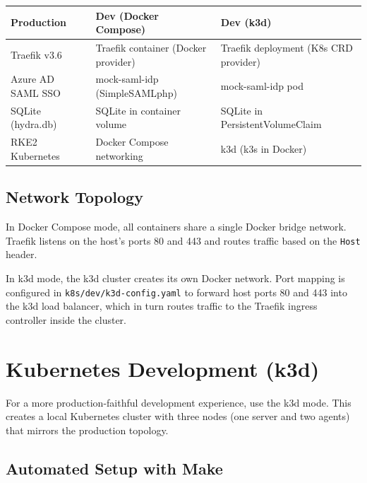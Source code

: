\documentclass[11pt,a4paper]{article}
\newcommand{\cmdref}[1]{\texttt{#1}}
\begin{document}
\begin{center}
\small
\begin{tabularx}{\textwidth}{l X X}
    \toprule
    \textbf{Production} & \textbf{Dev (Docker Compose)} & \textbf{Dev (k3d)} \\
    \midrule
    Traefik v3.6 &
        Traefik container (Docker provider) &
        Traefik deployment (K8s CRD provider) \\
    \addlinespace
    Azure AD SAML SSO &
        mock-saml-idp (SimpleSAMLphp) &
        mock-saml-idp pod \\
    \addlinespace
    SQLite (hydra.db) &
        SQLite in container volume &
        SQLite in PersistentVolumeClaim \\
    \addlinespace
    RKE2 Kubernetes &
        Docker Compose networking &
        k3d (k3s in Docker) \\
    \bottomrule
\end{tabularx}
\end{center}

\subsection{Network Topology}

In Docker Compose mode, all containers share a single Docker bridge
network. Traefik listens on the host's ports 80 and 443 and routes traffic
based on the \texttt{Host} header.

In k3d mode, the k3d cluster creates its own Docker network. Port mapping
is configured in \cmdref{k8s/dev/k3d-config.yaml} to forward host ports
80 and 443 into the k3d load balancer, which in turn routes traffic to the
Traefik ingress controller inside the cluster.

\section{Kubernetes Development (k3d)}
\label{sec:k3d}

For a more production-faithful development experience, use the k3d mode.
This creates a local Kubernetes cluster with three nodes (one server and
two agents) that mirrors the production topology.

\subsection{Automated Setup with Make}
\end{document}
